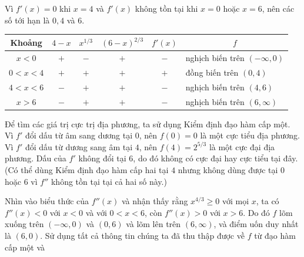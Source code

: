 \noindent
Vì $f'(x) = 0$ khi $x = 4$ và $f'(x)$ không tồn tại khi $x = 0$ hoặc $x = 6$, nên các số tới hạn là $0, 4$ và $6$.

\begin{center}
\small
\renewcommand{\arraystretch}{1.25}
\setlength{\tabcolsep}{8pt}
\begin{tabular}{|c|c|c|c|c|l|}
\hline
\rowcolor{tableheader}
\textbf{Khoảng} & \boldmath$4 - x$ & \boldmath$x^{1/3}$ & \boldmath$(6 - x)^{2/3}$ & \boldmath$f'(x)$ & \multicolumn{1}{c|}{\boldmath$f$} \\
\hline
$x < 0$     & $+$ & $-$ & $+$ & $-$ & nghịch biến trên $(-\infty, 0)$ \\
$0 < x < 4$ & $+$ & $+$ & $+$ & $+$ & đồng biến trên $(0, 4)$ \\
$4 < x < 6$ & $-$ & $+$ & $+$ & $-$ & nghịch biến trên $(4, 6)$ \\
$x > 6$     & $-$ & $+$ & $+$ & $-$ & nghịch biến trên $(6, \infty)$ \\
\hline
\end{tabular}
\end{center}

Để tìm các giá trị cực trị địa phương, ta sử dụng Kiểm định đạo hàm cấp một. Vì $f'$ đổi dấu từ âm sang dương tại $0$, nên $f(0) = 0$ là một cực tiểu địa phương. Vì $f'$ đổi dấu từ dương sang âm tại $4$, nên $f(4) = 2^{5/3}$ là một cực đại địa phương. Dấu của $f'$ không đổi tại $6$, do đó không có cực đại hay cực tiểu tại đây. (Có thể dùng Kiểm định đạo hàm cấp hai tại $4$ nhưng không dùng được tại $0$ hoặc $6$ vì $f''$ không tồn tại tại cả hai số này.)

Nhìn vào biểu thức của $f''(x)$ và nhận thấy rằng $x^{4/3} \geqslant 0$ với mọi $x$, ta có $f''(x) < 0$ với $x < 0$ và với $0 < x < 6$, còn $f''(x) > 0$ với $x > 6$. Do đó $f$ lõm xuống trên $(-\infty, 0)$ và $(0, 6)$ và lõm lên trên $(6, \infty)$, và điểm uốn duy nhất là $(6, 0)$. Sử dụng tất cả thông tin chúng ta đã thu thập được về $f$ từ đạo hàm cấp một và
